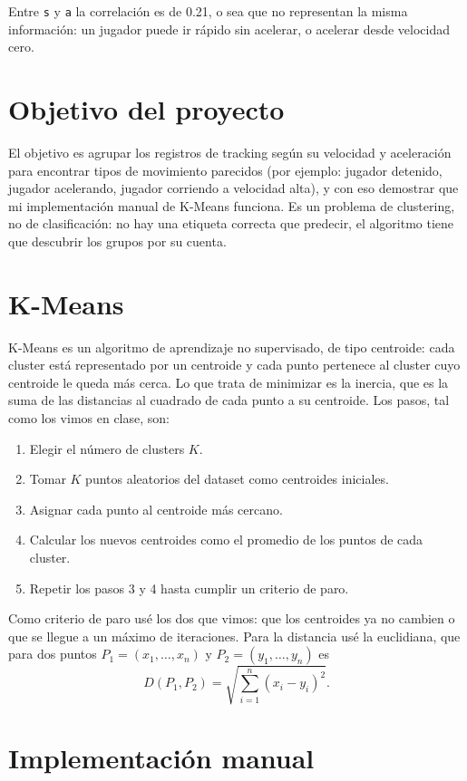 \documentclass[11pt,a4paper]{article}
\begin{document}
Entre \texttt{s} y \texttt{a} la correlación es de 0.21, o sea que no representan la misma información: un jugador puede ir rápido sin acelerar, o acelerar desde velocidad cero.

\section{Objetivo del proyecto}

El objetivo es agrupar los registros de tracking según su velocidad y aceleración para encontrar tipos de movimiento parecidos (por ejemplo: jugador detenido, jugador acelerando, jugador corriendo a velocidad alta), y con eso demostrar que mi implementación manual de K-Means funciona. Es un problema de clustering, no de clasificación: no hay una etiqueta correcta que predecir, el algoritmo tiene que descubrir los grupos por su cuenta.

\section{K-Means}

K-Means es un algoritmo de aprendizaje no supervisado, de tipo centroide: cada cluster está representado por un centroide y cada punto pertenece al cluster cuyo centroide le queda más cerca. Lo que trata de minimizar es la inercia, que es la suma de las distancias al cuadrado de cada punto a su centroide. Los pasos, tal como los vimos en clase, son:

\begin{enumerate}
  \item Elegir el número de clusters $K$.
  \item Tomar $K$ puntos aleatorios del dataset como centroides iniciales.
  \item Asignar cada punto al centroide más cercano.
  \item Calcular los nuevos centroides como el promedio de los puntos de cada cluster.
  \item Repetir los pasos 3 y 4 hasta cumplir un criterio de paro.
\end{enumerate}

Como criterio de paro usé los dos que vimos: que los centroides ya no cambien o que se llegue a un máximo de iteraciones. Para la distancia usé la euclidiana, que para dos puntos $P_1 = (x_1, \ldots, x_n)$ y $P_2 = (y_1, \ldots, y_n)$ es
\[
  D(P_1, P_2) = \sqrt{\sum_{i=1}^{n} (x_i - y_i)^2}.
\]

\section{Implementación manual}
\end{document}
